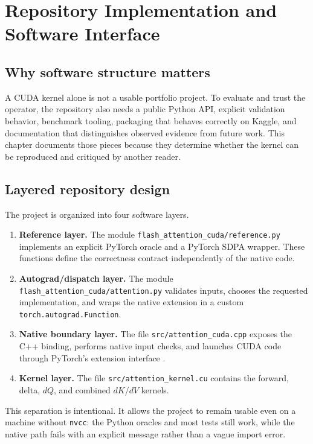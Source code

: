 \chapter{Repository Implementation and Software Interface}
\label{chap:implementation}

\section{Why software structure matters}

A CUDA kernel alone is not a usable portfolio project. To evaluate and trust the operator, the repository also needs a public Python API, explicit validation behavior, benchmark tooling, packaging that behaves correctly on Kaggle, and documentation that distinguishes observed evidence from future work. This chapter documents those pieces because they determine whether the kernel can be reproduced and critiqued by another reader.

\section{Layered repository design}

The project is organized into four software layers.

\begin{enumerate}
  \item \textbf{Reference layer.} The module \texttt{flash\_attention\_cuda/reference.py} implements an explicit PyTorch oracle and a PyTorch SDPA wrapper. These functions define the correctness contract independently of the native code.
  \item \textbf{Autograd/dispatch layer.} The module \texttt{flash\_attention\_cuda/attention.py} validates inputs, chooses the requested implementation, and wraps the native extension in a custom \texttt{torch.autograd.Function}.
  \item \textbf{Native boundary layer.} The file \texttt{src/attention\_cuda.cpp} exposes the C++ binding, performs native input checks, and launches CUDA code through PyTorch's extension interface \citep{pytorch212extension}.
  \item \textbf{Kernel layer.} The file \texttt{src/attention\_kernel.cu} contains the forward, delta, $dQ$, and combined $dK$/$dV$ kernels.
\end{enumerate}

This separation is intentional. It allows the project to remain usable even on a machine without \texttt{nvcc}: the Python oracles and most tests still work, while the native path fails with an explicit message rather than a vague import error.

